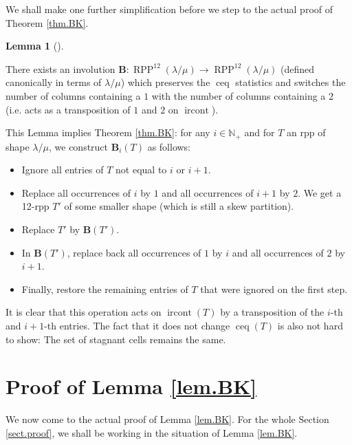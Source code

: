 \documentclass[numbers=enddot,12pt,final,onecolumn,notitlepage]{scrartcl}%
\theoremstyle{definition}
\newtheorem{lem}[theo]{Lemma}
\newenvironment{lemma}[1][]
{\begin{lem}[#1]\begin{leftbar}}
{\end{leftbar}\end{lem}}
\newcommand{\Nplus}{\mathbb{N}_{+}}
\def\ceq{{\operatorname*{ceq}}}
\def\ircont{{\operatorname*{ircont}}}
\def\lm{{\lambda/\mu}}
\def\B{{\mathbf{B}}}
\def\OneTwoRPP{{\operatorname*{RPP}^{12}\left(  \lambda/\mu\right)}}
\begin{document}
We shall make one further simplification before we step to the actual proof of
Theorem \ref{thm.BK}.

\begin{lemma}
\label{lem.BK} There exists an
involution $\mathbf{B}:\OneTwoRPP\rightarrow\OneTwoRPP$ (defined canonically
in terms of $\lm$) which preserves the $\ceq$ statistics and switches the number of columns containing a $1$ with the number of columns containing a $2$ (i.e. acts as a transposition of $1$ and $2$ on $\ircont$).
\end{lemma}




 This Lemma implies Theorem \ref{thm.BK}: for any $i\in\Nplus$ and for $T$ an rpp of shape $\lm$, we construct $\B_i(T)$ as follows: 
 \begin{itemize}
  \item Ignore all entries of $T$ not equal to $i$ or $i+1$. 
  \item Replace all occurrences of $i$ by $1$ and all occurrences of $i+1$ by $2$. We get a 12-rpp $T'$ of some smaller shape (which is still a skew partition).
  \item Replace $T'$ by $\B(T')$.
  \item In $\B(T')$, replace back all occurrences of $1$ by $i$ and all occurrences of $2$ by $i+1$.
  \item Finally, restore the remaining entries of $T$ that were ignored on the first step.
 \end{itemize}
 
 It is clear that this operation acts on $\ircont(T)$ by a transposition of the $i$-th and $i+1$-th entries. The fact that it does not change $\ceq(T)$ is also not hard to show: The set of stagnant cells remains the same.

\section{\label{sect.proof}Proof of Lemma \ref{lem.BK}}

We now come to the actual proof of Lemma \ref{lem.BK}. For the whole Section
\ref{sect.proof}, we shall be working in the situation of Lemma \ref{lem.BK}.
\end{document}
